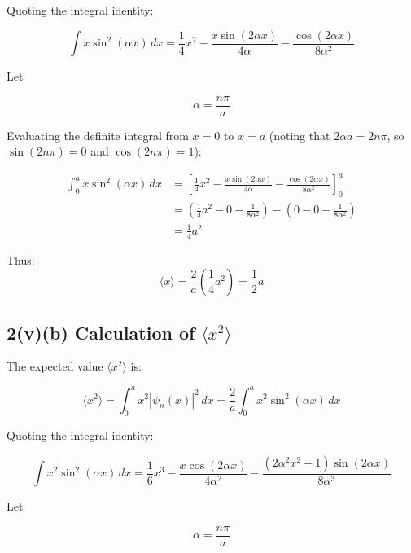 \documentclass{article}
\begin{document}
Quoting the integral identity:

\begin{equation*}
\int x \sin^2(\alpha x) \, dx = \frac{1}{4}x^2 - \frac{x\sin(2\alpha x)}{4\alpha} - \frac{\cos(2\alpha x)}{8\alpha^2}
\end{equation*}

Let

\begin{equation*}
\alpha = \frac{n\pi}{a}
\end{equation*}

Evaluating the definite integral from $x = 0$ to $x = a$ (noting that $2\alpha a = 2n\pi$, so $\sin(2n\pi) = 0$ and $\cos(2n\pi) = 1$):

\begin{align}
\int_0^a x \sin^2(\alpha x) \, dx &= \left[ \frac{1}{4}x^2 - \frac{x\sin(2\alpha x)}{4\alpha} - \frac{\cos(2\alpha x)}{8\alpha^2} \right]_0^a \\
&= \left( \frac{1}{4}a^2 - 0 - \frac{1}{8\alpha^2} \right) - \left( 0 - 0 - \frac{1}{8\alpha^2} \right) \\
&= \frac{1}{4}a^2
\end{align}

Thus:
\begin{equation*}
\boxed{\langle x \rangle = \frac{2}{a} \left( \frac{1}{4}a^2 \right) = \frac{1}{2}a}
\end{equation*}


\subsection*{2(v)(b) Calculation of $\langle x^2 \rangle$}

The expected value $\langle x^2 \rangle$ is:

\begin{equation*}
\langle x^2 \rangle = \int_0^a x^2 |\psi_n(x)|^2 \, dx = \frac{2}{a} \int_0^a x^2 \sin^2(\alpha x) \, dx
\end{equation*}

Quoting the integral identity:

\begin{equation*}
\int x^2 \sin^2(\alpha x) \, dx = \frac{1}{6}x^3 - \frac{x \cos(2\alpha x)}{4\alpha^2} - \frac{(2\alpha^2 x^2 - 1)\sin(2\alpha x)}{8\alpha^3}
\end{equation*}

Let

\begin{equation*}
\alpha = \frac{n\pi}{a}
\end{equation*}
\end{document}
